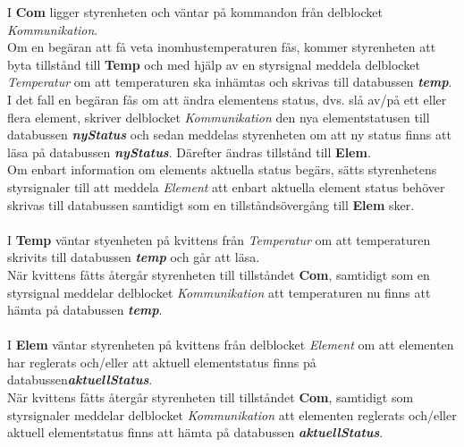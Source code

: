 \documentclass[a4paper]{scrartcl}
\begin{document}
		I \textbf{Com} ligger styrenheten och väntar på kommandon från delblocket \emph{Kommunikation}.
		\\
		Om en begäran att få veta inomhustemperaturen fås, kommer styrenheten att byta tillstånd till \textbf{Temp} och med hjälp av
		en styrsignal meddela delblocket \emph{Temperatur} om att temperaturen ska inhämtas och skrivas till databussen \textbf{\emph{temp}}.
		\\
		I det fall en begäran fås om att ändra elementens status, dvs. slå av/på ett eller flera element, skriver delblocket \emph{Kommunikation}
		den nya elementstatusen till databussen \textbf{\emph{nyStatus}} och sedan meddelas styrenheten om att ny status finns att läsa på databussen \textbf{\emph{nyStatus}}. Därefter
		ändras tillstånd till \textbf{Elem}.
		\\
		Om enbart information om elements aktuella status begärs, sätts styrenhetens styrsignaler till att meddela \emph{Element}
		att enbart aktuella element status behöver skrivas till databussen samtidigt som en tillståndsövergång till \textbf{Elem} sker.
		\\\\
		I \textbf{Temp} väntar styenheten på kvittens från \emph{Temperatur} om att temperaturen skrivits till databussen \textbf{\emph{temp}}
		och går att läsa.
		\\
		När kvittens fåtts återgår styrenheten till tillståndet \textbf{Com}, samtidigt som en styrsignal meddelar delblocket \emph{Kommunikation}
		att temperaturen nu finns att hämta på databussen \textbf{\emph{temp}}.
		\\\\
		I \textbf{Elem} väntar styrenheten på kvittens från delblocket \emph{Element} om att elementen har reglerats och/eller
		att aktuell elementstatus finns på databussen\textbf{\emph{aktuellStatus}}.
		\\
		När kvittens fåtts återgår styrenheten till tillståndet \textbf{Com}, samtidigt som styrsignaler meddelar delblocket \emph{Kommunikation}
		att elementen reglerats och/eller aktuell elementstatus finns att hämta på databussen \textbf{\emph{aktuellStatus}}.

	
	\clearpage
\end{document}
